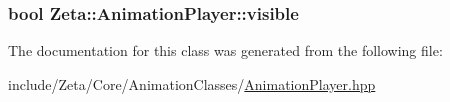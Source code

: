 \hypertarget{classZeta_1_1AnimationPlayer_a38f2ef2f0e15300c862b860ab3eb8534}{
\subsubsection[{visible}]{\setlength{\rightskip}{0pt plus 5cm}bool Zeta\+::\+Animation\+Player\+::visible\hspace{0.3cm}{\ttfamily [private]}}}\label{classZeta_1_1AnimationPlayer_a38f2ef2f0e15300c862b860ab3eb8534}


The documentation for this class was generated from the following file\+:\begin{DoxyCompactItemize}
\item 
include/\+Zeta/\+Core/\+Animation\+Classes/\hyperlink{AnimationPlayer_8hpp}{Animation\+Player.\+hpp}\end{DoxyCompactItemize}
